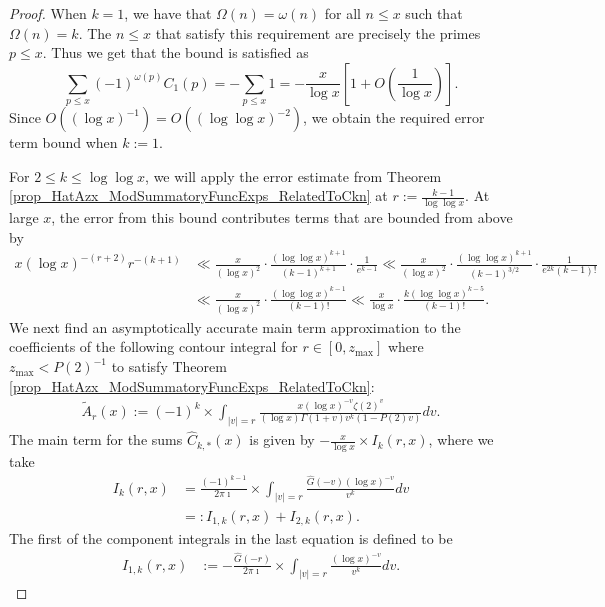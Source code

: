 \documentclass[11pt,reqno,a4letter]{article}
\numberwithin{figure}{section}
\numberwithin{table}{section}
\theoremstyle{plain}
\numberwithin{theorem}{section}
\theoremstyle{definition}
\begin{document}
\begin{proof} 
When $k = 1$, we have that $\Omega(n) = \omega(n)$ for all $n \leq x$ such that $\Omega(n) = k$. 
The $n \leq x$ that satisfy this requirement are precisely the primes $p \leq x$. 
Thus we get that the bound is satisfied as 
\[
\sum_{p \leq x} (-1)^{\omega(p)} C_1(p) = -\sum_{p \leq x} 1 = 
     - \frac{x}{\log x} \left[1 + O\left(\frac{1}{\log x}\right)\right]. 
\]
Since $O((\log x)^{-1}) = O((\log\log x)^{-2})$, we obtain the required error term 
bound when $k := 1$. 

For $2 \leq k \leq \log\log x$, we will apply the error estimate from 
Theorem \ref{prop_HatAzx_ModSummatoryFuncExps_RelatedToCkn} at 
$r := \frac{k-1}{\log\log x}$. 
At large $x$, the error from this bound contributes terms that are bounded from above by 
\begin{align*} 
x (\log x)^{-(r+2)} r^{-(k+1)} & \ll \frac{x}{(\log x)^2} \cdot 
     \frac{(\log\log x)^{k+1}}{(k-1)^{k+1}} \cdot \frac{1}{e^{k-1}} 
     \ll \frac{x}{(\log x)^2} \cdot \frac{(\log\log x)^{k+1}}{(k-1)^{3/2}} \cdot 
     \frac{1}{e^{2k} (k-1)!} \\ 
     & \ll \frac{x}{(\log x)^2} \cdot \frac{(\log\log x)^{k-1}}{(k-1)!} \ll 
     \frac{x}{\log x} \cdot \frac{k (\log\log x)^{k-5}}{(k-1)!}. 
\end{align*} 
We next find an asymptotically accurate main term approximation to the coefficients 
of the following contour integral for $r \in [0, z_{\max}]$ where $z_{\max} < P(2)^{-1}$ 
to satisfy Theorem \ref{prop_HatAzx_ModSummatoryFuncExps_RelatedToCkn}: 
\begin{align} 
\label{eqn_WideTildeArx_CountourIntDef_v1} 
\widetilde{A}_r(x) := 
     (-1)^k \times \int_{|v|=r} \frac{x (\log x)^{-v} \zeta(2)^{v}}{(\log x) \Gamma(1+v) 
     v^{k} (1 - P(2) v)} dv. 
\end{align} 
The main term for the sums $\widehat{C}_{k,\ast}(x)$ 
is given by $-\frac{x}{\log x} \times I_k(r, x)$, where we take 
\begin{align*}
I_k(r, x) & = \frac{(-1)^{k-1}}{2\pi\imath} \times \int_{|v|=r} 
     \frac{\widehat{G}(-v) (\log x)^{-v}}{v^k} dv \\ 
     & =: I_{1,k}(r, x) + I_{2,k}(r, x). 
\end{align*}
The first of the component integrals in the last equation is defined to be 
\begin{align*}
I_{1,k}(r, x) & := -\frac{\widehat{G}(-r)}{2\pi\imath} \times \int_{|v|=r} 
     \frac{(\log x)^{-v}}{v^k} dv. 
\end{align*}

\end{proof}
\end{document}
